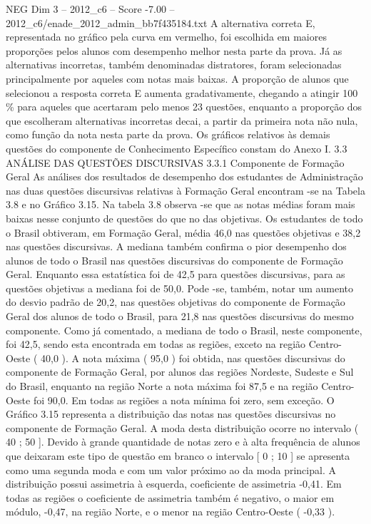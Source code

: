 \begin{textsample}{NEG Dim 3 – 2012\_c6 – Score -7.00 – 2012\_c6/enade\_2012\_admin\_bb7f435184.txt}
A alternativa correta E, representada no gráfico pela curva em vermelho, foi escolhida em maiores proporções pelos alunos com desempenho melhor nesta parte da prova.
Já as alternativas incorretas, também denominadas distratores, foram selecionadas principalmente por aqueles com notas mais baixas.
A proporção de alunos que selecionou a resposta correta E aumenta gradativamente, chegando a atingir 100 \% para aqueles que acertaram pelo menos 23 questões, enquanto a proporção dos que escolheram alternativas incorretas decai, a partir da primeira nota não nula, como função da nota nesta parte da prova.
Os gráficos relativos às demais questões do componente de Conhecimento Específico constam do Anexo I. 3.3 ANÁLISE DAS QUESTÕES DISCURSIVAS 3.3.1 Componente de Formação Geral As análises dos resultados de desempenho dos estudantes de Administração nas duas questões discursivas relativas à Formação Geral encontram -se na Tabela 3.8 e no Gráfico 3.15.
Na tabela 3.8 observa -se que as notas médias foram mais baixas nesse conjunto de questões do que no das objetivas.
Os estudantes de todo o Brasil obtiveram, em Formação Geral, média 46,0 nas questões objetivas e 38,2 nas questões discursivas.
A mediana também confirma o pior desempenho dos alunos de todo o Brasil nas questões discursivas do componente de Formação Geral.
Enquanto essa estatística foi de 42,5 para questões discursivas, para as questões objetivas a mediana foi de 50,0.
Pode -se, também, notar um aumento do desvio padrão de 20,2, nas questões objetivas do componente de Formação Geral dos alunos de todo o Brasil, para 21,8 nas questões discursivas do mesmo componente.
Como já comentado, a mediana de todo o Brasil, neste componente, foi 42,5, sendo esta encontrada em todas as regiões, exceto na região Centro-Oeste ( 40,0 ).
A nota máxima ( 95,0 ) foi obtida, nas questões discursivas do componente de Formação Geral, por alunos das regiões Nordeste, Sudeste e Sul do Brasil, enquanto na região Norte a nota máxima foi 87,5 e na região Centro-Oeste foi 90,0.
Em todas as regiões a nota mínima foi zero, sem exceção.
O Gráfico 3.15 representa a distribuição das notas nas questões discursivas no componente de Formação Geral.
A moda desta distribuição ocorre no intervalo ( 40 ; 50 ].
Devido à grande quantidade de notas zero e à alta frequência de alunos que deixaram este tipo de questão em branco o intervalo [ 0 ; 10 ] se apresenta como uma segunda moda e com um valor próximo ao da moda principal.
A distribuição possui assimetria à esquerda, coeficiente de assimetria -0,41.
Em todas as regiões o coeficiente de assimetria também é negativo, o maior em módulo, -0,47, na região Norte, e o menor na região Centro-Oeste ( -0,33 ).

\end{textsample}
